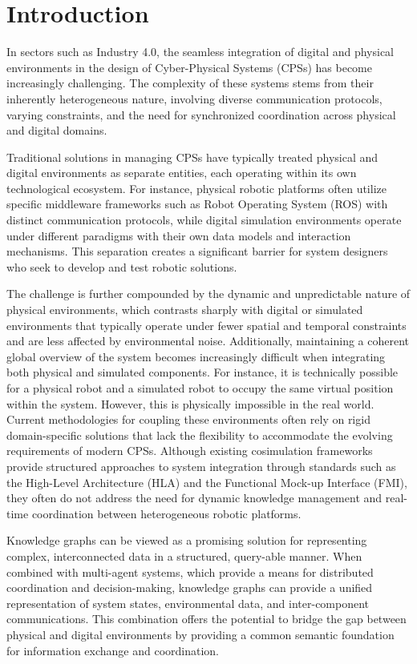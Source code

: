 \documentclass{article} %
\begin{document}
\section{Introduction} 
In sectors such as Industry 4.0, the seamless integration of digital and physical environments in the design of Cyber-Physical Systems (CPSs) has become increasingly challenging\cite{hafiene2025knowledge}. The complexity of these systems stems from their inherently heterogeneous nature, involving diverse communication protocols, varying constraints, and the need for synchronized coordination across physical and digital domains.

Traditional solutions in managing CPSs have typically treated physical and digital environments as separate entities, each operating within its own technological ecosystem. For instance, physical robotic platforms often utilize specific middleware frameworks such as Robot Operating System (ROS) with distinct communication protocols, while digital simulation environments operate under different paradigms with their own data models and interaction mechanisms. This separation creates a significant barrier for system designers who seek to develop and test robotic solutions.

The challenge is further compounded by the dynamic and unpredictable nature of physical environments, which contrasts sharply with digital or simulated environments that typically operate under fewer spatial and temporal constraints and are less affected by environmental noise. Additionally, maintaining a coherent global overview of the system becomes increasingly difficult when integrating both physical and simulated components. For instance, it is technically possible for a physical robot and a simulated robot to occupy the same virtual position within the system. However, this is physically impossible in the real world. Current methodologies for coupling these environments often rely on rigid domain-specific solutions that lack the flexibility to accommodate the evolving requirements of modern CPSs. Although existing cosimulation frameworks provide structured approaches to system integration through standards such as the High-Level Architecture (HLA) \cite{dahmann1997department} and the Functional Mock-up Interface (FMI)\cite{blochwitz2011functional}, they often do not address the need for dynamic knowledge management and real-time coordination between heterogeneous robotic platforms\cite{ndiaye2018simulation}.

Knowledge graphs can be viewed as a promising solution for representing complex, interconnected data in a structured, query-able manner\cite{hogan2021knowledge}. When combined with multi-agent systems, which provide a means for distributed coordination and decision-making, knowledge graphs can provide a unified representation of system states, environmental data, and inter-component communications. This combination offers the potential to bridge the gap between physical and digital environments by providing a common semantic foundation for information exchange and coordination.
\end{document}
